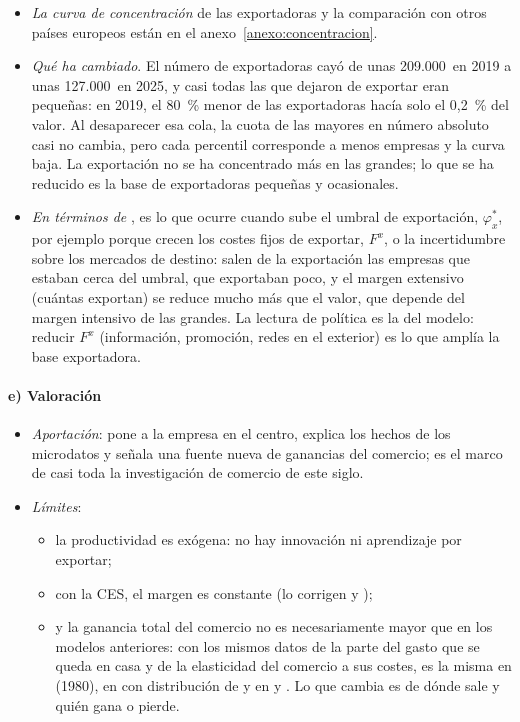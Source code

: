 \documentclass[11pt]{article}
\begin{document}
\begin{itemize}
\item \emph{La curva de concentración} de las exportadoras y la comparación con otros países europeos están en el anexo~\ref{anexo:concentracion}.
\item \emph{Qué ha cambiado}. El número de exportadoras cayó de unas 209.000~en 2019 a unas 127.000~en 2025, y casi todas las que dejaron de exportar eran pequeñas: en 2019, el 80~\% menor de las exportadoras hacía solo el 0,2~\% del valor. Al desaparecer esa cola, la cuota de las mayores en número absoluto casi no cambia, pero cada percentil corresponde a menos empresas y la curva baja. La exportación no se ha concentrado más en las grandes; lo que se ha reducido es la base de exportadoras pequeñas y ocasionales\nocite{AEAT2026MicrodatosEmpresas}.
\item \emph{En términos de }, es lo que ocurre cuando sube el umbral de exportación, $\varphi^*_x$, por ejemplo porque crecen los costes fijos de exportar, $F^x$, o la incertidumbre sobre los mercados de destino: salen de la exportación las empresas que estaban cerca del umbral, que exportaban poco, y el margen extensivo (cuántas exportan) se reduce mucho más que el valor, que depende del margen intensivo de las grandes. La lectura de política es la del modelo: reducir $F^x$ (información, promoción, redes en el exterior) es lo que amplía la base exportadora.
\end{itemize}


\paragraph{e) Valoración}

\begin{itemize}
\item \emph{Aportación}: pone a la empresa en el centro, explica los hechos de los microdatos y señala una fuente nueva de ganancias del comercio; es el marco de casi toda la investigación de comercio de este siglo.
\item \emph{Límites}:
  \begin{itemize}
  \item la productividad es exógena: no hay innovación ni aprendizaje por exportar;
  \item con la CES, el margen es constante (lo corrigen  y );
  \item y la ganancia total del comercio no es necesariamente mayor que en los modelos anteriores: con los mismos datos de la parte del gasto que se queda en casa y de la elasticidad del comercio a sus costes, es la misma en  (1980), en  con distribución de  y en  y \nocite{ArkolakisCostinotRodriguezClare2012New}. Lo que cambia es de dónde sale y quién gana o pierde.
  \end{itemize}
\end{itemize}
\end{document}
